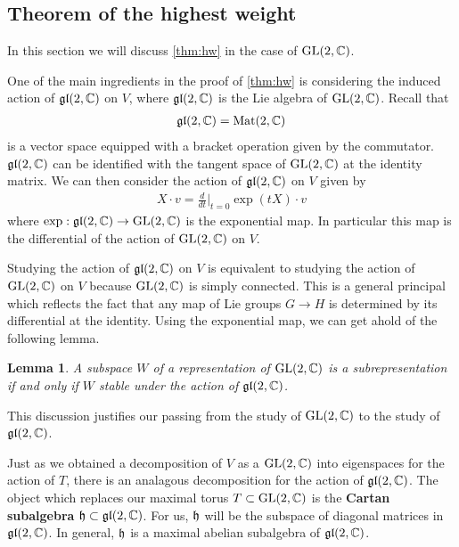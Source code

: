 \documentclass{amsart}
\numberwithin{equation}{section}
\theoremstyle{plain} %
\newtheorem{lemma}[equation]{Lemma}
\theoremstyle{definition}
\theoremstyle{remark}
\begin{document}
\subsection{Theorem of the highest weight}
In this section we will discuss \ref{thm:hw} in the case of $\operatorname{GL}(2,\mathbb{C})$.

\hfill

One of the main ingredients in the proof of \ref{thm:hw} is considering the induced action of $\operatorname{\mathfrak{gl}}(2,\mathbb{C})$ on $V$,
where $\operatorname{\mathfrak{gl}}(2,\mathbb{C})$ is the Lie algebra of $\operatorname{GL}(2,\mathbb{C})$. Recall that \begin{align*}
    \operatorname{\mathfrak{gl}}(2,\mathbb{C}) = \operatorname{Mat}(2,\mathbb{C})
\end{align*} is a vector space equipped with a bracket operation given by the commutator. $\operatorname{\mathfrak{gl}}(2,\mathbb{C})$
can be identified with the tangent space of $\operatorname{GL}(2,\mathbb{C})$ at the identity matrix. We can then consider the action of $\operatorname{\mathfrak{gl}}(2,\mathbb{C})$ on $V$ given by \begin{align*}
    X\cdot v = \frac{d}{dt}\bigg\vert_{t=0} \exp(tX)\cdot v
\end{align*} where $\exp: \operatorname{\mathfrak{gl}}(2,\mathbb{C})\to \operatorname{GL}(2,\mathbb{C})$ is the exponential map. In particular this map is the differential of the action of $\operatorname{GL}(2,\mathbb{C})$ on $V$.

\hfill

Studying the action of $\operatorname{\mathfrak{gl}}(2,\mathbb{C})$ on $V$ is equivalent to studying the action of $\operatorname{GL}(2,\mathbb{C})$ on $V$ because $\operatorname{GL}(2,\mathbb{C})$ is simply
connected. This is a general principal which reflects the fact that any map of Lie groups $G\to H$ is determined by its differential at the identity.
Using the exponential map, we can get ahold of the following lemma.
\begin{lemma}
    A subspace $W$ of a representation of $\operatorname{GL}(2,\mathbb{C})$ is a subrepresentation if and only if $W$ stable under the action of $\operatorname{\mathfrak{gl}}(2,\mathbb{C})$.
\end{lemma}
This discussion justifies our passing from the study of $\operatorname{GL}(2,\mathbb{C})$ to the study of $\operatorname{\mathfrak{gl}}(2,\mathbb{C})$.

\hfill

Just as we obtained a decomposition of $V$ as a $\operatorname{GL}(2,\mathbb{C})$ into eigenspaces for the action of $T$,
there is an analagous decomposition for the action of $\operatorname{\mathfrak{gl}}(2,\mathbb{C})$. 
The object which replaces our maximal torus $T\subset\operatorname{GL}(2,\mathbb{C})$ is the \textbf{Cartan subalgebra} $\mathfrak{h}\subset \operatorname{\mathfrak{gl}}(2,\mathbb{C})$.
For us, $\mathfrak{h}$ will be the subspace of diagonal matrices in $\operatorname{\mathfrak{gl}}(2,\mathbb{C})$. In general, $\mathfrak{h}$ is a maximal abelian subalgebra of $\operatorname{\mathfrak{gl}}(2,\mathbb{C})$.
\end{document}
